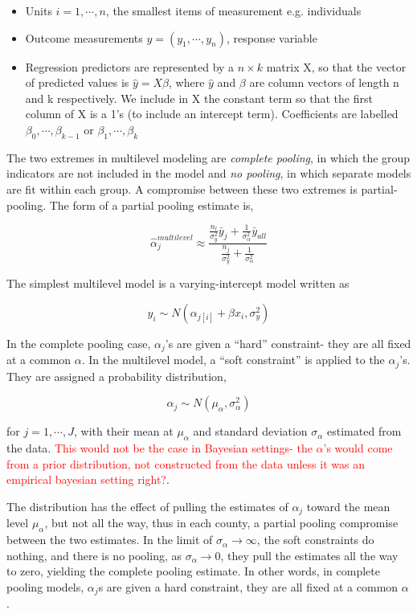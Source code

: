 \documentclass[12pt,]{article}
\begin{document}
\begin{itemize}
\item{Units $i = 1, \cdots, n$, the smallest items of measurement e.g. individuals}
\item{Outcome measurements $y = (y_1, \cdots, y_n)$, response variable}
\item{Regression predictors are represented by a $n \times k$ matrix X, so that the vector of predicted values is $\hat{y} = X\beta$, where $\hat{y}$ and $\beta$ are column vectors of length n and k respectively. We include in X the constant term so that the first column of X is a 1's (to include an intercept term). Coefficients are labelled $\beta_0, \cdots, \beta_{k-1}$ or $\beta_1, \cdots, \beta_k$}
\end{itemize}

The two extremes in multilevel modeling are \emph{complete pooling}, in
which the group indicators are not included in the model and \emph{no
pooling}, in which separate models are fit within each group. A
compromise between these two extremes is partial-pooling. The form of a
partial pooling estimate is,

\[
\hat{\alpha}_j^{multilevel} \approx \frac{\frac{n_l}{\sigma^2_y}\bar{y}_j + \frac{1}{\sigma^2_\alpha}\bar{y}_{all}}{\frac{n_j}{\sigma^2_y} + \frac{1}{\sigma^2_\alpha}}
\]

The simplest multilevel model is a varying-intercept model written as

\[y_i \sim N(\alpha_{j[i]} + \beta x_i, \sigma_y^2)\]

In the complete pooling case, \(\alpha_j\)'s are given a ``hard''
constraint- they are all fixed at a common \(\alpha\). In the multilevel
model, a ``soft constraint'' is applied to the \(\alpha_j\)'s. They are
assigned a probability distribution,

\[\alpha_j \sim N(\mu_\alpha, \sigma^2_\alpha)\]

for \(j = 1, \cdots, J\), with their mean at \(\mu_\alpha\) and standard
deviation \(\sigma_\alpha\) estimated from the data.
\textcolor{red}{This would not be the case in Bayesian settings- the $\alpha$'s would come from a prior distribution, not constructed from the data unless it was an empirical bayesian setting right?}.

The distribution has the effect of pulling the estimates of \(\alpha_j\)
toward the mean level \(\mu_\alpha\), but not all the way, thus in each
county, a partial pooling compromise between the two estimates. In the
limit of \(\sigma_\alpha \rightarrow \infty\), the soft constraints do
nothing, and there is no pooling, as \(\sigma_\alpha \rightarrow 0\),
they pull the estimates all the way to zero, yielding the complete
pooling estimate. In other words, in complete pooling models,
\(\alpha_j\)s are given a hard constraint, they are all fixed at a
common \(\alpha\).
\end{document}
